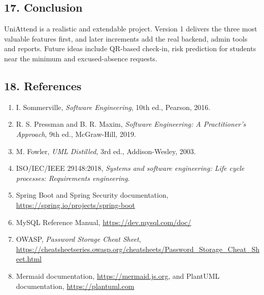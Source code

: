 \documentclass[
  11pt,
]{article}
\providecommand{\tightlist}{%
  \setlength{\itemsep}{0pt}\setlength{\parskip}{0pt}}
\begin{document}
\hypertarget{conclusion}{%
\subsection{17. Conclusion}\label{conclusion}}

UniAttend is a realistic and extendable project. Version 1 delivers the
three most valuable features first, and later increments add the real
backend, admin tools and reports. Future ideas include QR-based
check-in, risk prediction for students near the minimum and
excused-absence requests.

\hypertarget{references}{%
\subsection{18. References}\label{references}}

\begin{enumerate}
\def\labelenumi{\arabic{enumi}.}
\tightlist
\item
  I. Sommerville, \emph{Software Engineering}, 10th ed., Pearson, 2016.
\item
  R. S. Pressman and B. R. Maxim, \emph{Software Engineering: A
  Practitioner's Approach}, 9th ed., McGraw-Hill, 2019.
\item
  M. Fowler, \emph{UML Distilled}, 3rd ed., Addison-Wesley, 2003.
\item
  ISO/IEC/IEEE 29148:2018, \emph{Systems and software engineering: Life
  cycle processes: Requirements engineering}.
\item
  Spring Boot and Spring Security documentation,
  \url{https://spring.io/projects/spring-boot}
\item
  MySQL Reference Manual, \url{https://dev.mysql.com/doc/}
\item
  OWASP, \emph{Password Storage Cheat Sheet},
  \url{https://cheatsheetseries.owasp.org/cheatsheets/Password_Storage_Cheat_Sheet.html}
\item
  Mermaid documentation, \url{https://mermaid.js.org}, and PlantUML
  documentation, \url{https://plantuml.com}
\end{enumerate}
\end{document}
